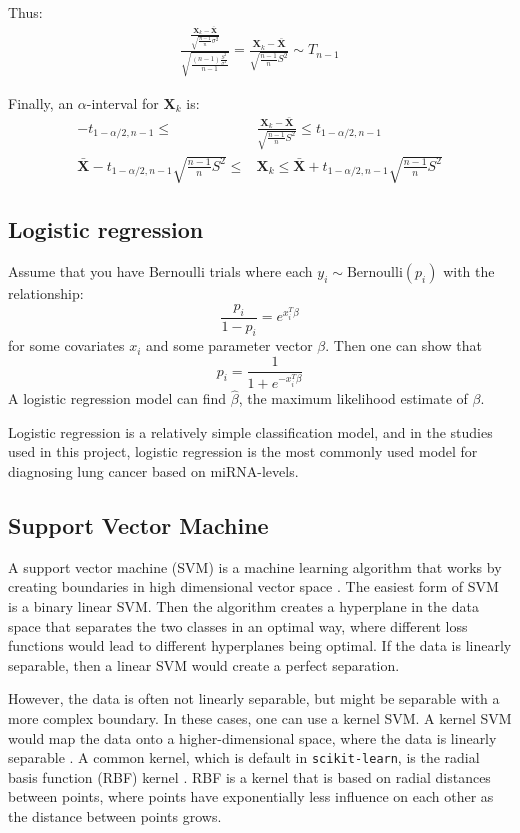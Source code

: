 Thus:
\begin{align*}
    \frac{\frac{\mathbf{X}_k - \mathbf{\bar{X}}}{\sqrt{\frac{n-1}{n}\sigma^2}}}{\sqrt{\frac{(n-1) \frac{S^2}{\sigma^2}}{n-1}}} =
    \frac{\mathbf{X}_k - \mathbf{\bar{X}}}{\sqrt{\frac{n-1}{n}S^2}} \sim T_{n-1}
\end{align*}

Finally, an $\alpha$-interval for $\mathbf{X}_k$ is:
\begin{align*}
    -t_{1-\alpha/2, n-1} \leq & \frac{\mathbf{X}_k - \mathbf{\bar{X}}}{\sqrt{\frac{n-1}{n}S^2}} \leq t_{1-\alpha/2, n-1} \\
   \mathbf{\bar{X}} - t_{1-\alpha/2, n-1} \sqrt{\frac{n-1}{n}S^2} \leq & \mathbf{X}_k \leq \mathbf{\bar{X}} + t_{1-\alpha/2, n-1} \sqrt{\frac{n-1}{n}S^2}
\end{align*}

\subsection{Logistic regression}

Assume that you have Bernoulli trials where each $y_i \sim \text{Bernoulli}(p_i)$ with the relationship:
$$\frac{p_i}{1-p_i} = e^{x_i^T\beta}$$
for some covariates $x_i$ and some parameter vector $\beta$.
Then one can show that
$$p_i = \frac{1}{1 + e^{-x_i^T\beta}}$$
A logistic regression model can find $\hat{\beta}$, the maximum likelihood estimate of $\beta$.

Logistic regression is a relatively simple classification model, and in the studies used in this project, logistic regression is the most commonly used model for diagnosing lung cancer based on miRNA-levels.

\subsection{Support Vector Machine}
\label{subsec:svm}

A support vector machine (SVM) is a machine learning algorithm that works by creating boundaries in high dimensional vector space \citep{svm}. The easiest form of SVM is a binary linear SVM. Then the algorithm creates a hyperplane in the data space that separates the two classes in an optimal way, where different loss functions would lead to different hyperplanes being optimal. If the data is linearly separable, then a linear SVM would create a perfect separation.

However, the data is often not linearly separable, but might be separable with a more complex boundary. In these cases, one can use a kernel SVM. A kernel SVM would map the data onto a higher-dimensional space, where the data is linearly separable \citep{kernel_svm}. A common kernel, which is default in \verb|scikit-learn|, is the radial basis function (RBF) kernel \citep{rbf}. RBF is a kernel that is based on radial distances between points, where points have exponentially less influence on each other as the distance between points grows.

